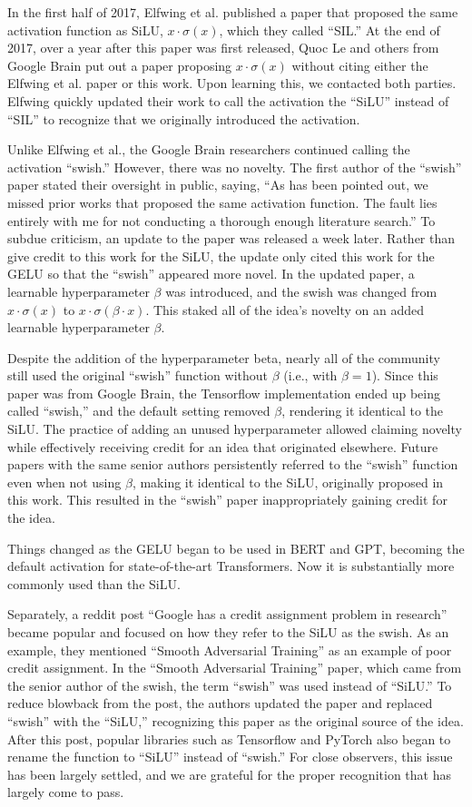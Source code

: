 \documentclass{article}
\begin{document}
In the first half of 2017, Elfwing et al. published a paper that proposed the same activation function as SiLU, $x\cdot \sigma(x)$, which they called ``SIL.'' At the end of 2017, over a year after this paper was first released, Quoc Le and others from Google Brain put out a paper proposing $x\cdot \sigma(x)$ without citing either the Elfwing et al. paper or this work. Upon learning this, we contacted both parties. Elfwing quickly updated their work to call the activation the ``SiLU'' instead of ``SIL'' to recognize that we originally introduced the activation.

Unlike Elfwing et al., the Google Brain researchers continued calling the activation ``swish.'' However, there was no novelty. The first author of the ``swish'' paper stated their oversight in public, saying, ``As has been pointed out, we missed prior works that proposed the same activation function. The fault lies entirely with me for not conducting a thorough enough literature search.''  To subdue criticism, an update to the paper was released a week later. Rather than give credit to this work for the SiLU, the update only cited this work for the GELU so that the ``swish'' appeared more novel. In the updated paper, a learnable hyperparameter $\beta$ was introduced, and the swish was changed from $x\cdot \sigma(x)$ to $x\cdot \sigma(\beta \cdot x)$. This staked all of the idea's novelty on an added learnable hyperparameter $\beta$.

Despite the addition of the hyperparameter beta, nearly all of the community still used the original ``swish'' function without $\beta$ (i.e., with $\beta=1$). Since this paper was from Google Brain, the Tensorflow implementation ended up being called ``swish,'' and the default setting removed $\beta$, rendering it identical to the SiLU. The practice of adding an unused hyperparameter allowed claiming novelty while effectively receiving credit for an idea that originated elsewhere. Future papers with the same senior authors persistently referred to the ``swish'' function even when not using $\beta$, making it identical to the SiLU, originally proposed in this work. This resulted in the ``swish'' paper inappropriately gaining credit for the idea.

Things changed as the GELU began to be used in BERT and GPT, becoming the default activation for state-of-the-art Transformers. Now it is substantially more commonly used than the SiLU.

Separately, a reddit post ``Google has a credit assignment problem in research'' became popular and focused on how they refer to the SiLU as the swish. As an example, they mentioned ``Smooth Adversarial Training'' as an example of poor credit assignment. In the ``Smooth Adversarial Training'' paper, which came from the senior author of the swish, the term ``swish'' was used instead of ``SiLU.'' To reduce blowback from the post, the authors updated the paper and replaced ``swish'' with the ``SiLU,'' recognizing this paper as the original source of the idea. After this post, popular libraries such as Tensorflow and PyTorch also began to rename the function to ``SiLU'' instead of ``swish.'' For close observers, this issue has been largely settled, and we are grateful for the proper recognition that has largely come to pass.
\end{document}
